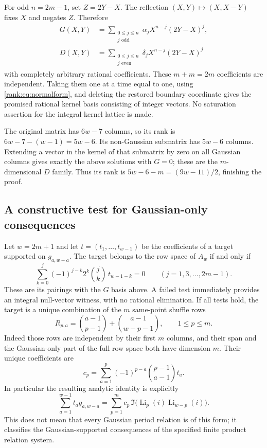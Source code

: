 \documentclass[11pt]{article}
\numberwithin{equation}{section}
\theoremstyle{plain}
\theoremstyle{definition}
\theoremstyle{remark}
\DeclareMathOperator{\Li}{Li}
\begin{document}
For odd $n=2m-1$, set $Z=2Y-X$. The reflection $(X,Y)\mapsto(X,X-Y)$
fixes $X$ and negates $Z$. Therefore
\begin{align*}
 G(X,Y)&=\sum_{\substack{0\le j\le n\\j\text{ odd}}}
          \alpha_jX^{n-j}(2Y-X)^j,\\
 D(X,Y)&=\sum_{\substack{0\le j\le n\\j\text{ even}}}
          \delta_jX^{n-j}(2Y-X)^j
\end{align*}
with completely arbitrary rational coefficients. These $m+m=2m$
coefficients are independent. Taking them one at a time equal to one,
using \eqref{rank:eq:normalform}, and deleting the restored boundary
coordinate gives the promised rational kernel basis consisting of integer vectors.
No saturation assertion for the integral kernel lattice is made.

The original matrix has $6w-7$ columns, so its rank is
$6w-7-(w-1)=5w-6$. Its non-Gaussian submatrix has $5w-6$ columns.
Extending a vector in the kernel of that submatrix by zero on all
Gaussian columns gives exactly the above solutions with $G=0$;
these are the $m$-dimensional $D$ family. Thus its rank is
$5w-6-m=(9w-11)/2$, finishing the proof.

\subsection{A constructive test for Gaussian-only consequences}
Let $w=2m+1$ and let $t=(t_1,\ldots,t_{w-1})$ be the coefficients of a
target supported on $g_{a,w-a}$. The target belongs to the row space
of $A_w$ if and only if
\begin{equation}\label{rank:eq:momenttest}
 \sum_{k=0}^{j}(-1)^{j-k}2^k\binom{j}{k}\,t_{w-1-k}=0
 \qquad(j=1,3,\ldots,2m-1).
\end{equation}
These are its pairings with the $G$ basis above. A failed test immediately
provides an integral null-vector witness, with no rational elimination.
If all tests hold, the target is a unique combination of the $m$
same-point shuffle rows
\[
 R_{p,a}=\binom{a-1}{p-1}+\binom{a-1}{w-p-1},\qquad 1\le p\le m.
\]
Indeed those rows are independent by their first $m$ columns, and their
span and the Gaussian-only part of the full row space both have
dimension $m$. Their unique coefficients are
\begin{equation}\label{rank:eq:coefficient-extraction}
 c_p=\sum_{a=1}^p(-1)^{p-a}\binom{p-1}{a-1}t_a.
\end{equation}
In particular the resulting analytic identity is explicitly
\[
 \sum_{a=1}^{w-1}t_a g_{a,w-a}
 =\sum_{p=1}^m c_p\,\Im\bigl(\Li_p(i)\Li_{w-p}(i)\bigr).
\]
This does not mean that every Gaussian period relation is of this form;
it classifies the Gaussian-supported consequences of the specified
finite product relation system.
\end{document}
